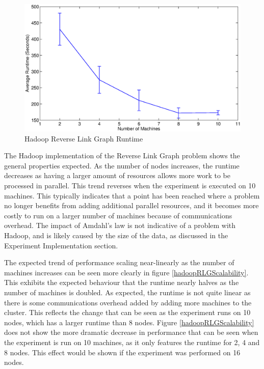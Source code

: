 \begin{figure}[H]
	\centering
	\includegraphics[scale=0.6]{resources/HadoopRLG.eps}
	\caption{Hadoop Reverse Link Graph Runtime}
	\label{hadoopRLGRuntime}
\end{figure}

The Hadoop implementation of the Reverse Link Graph problem shows the general properties expected. As the number of nodes increases, the runtime decreases as having a larger amount of resources allows more work to be processed in parallel. This trend reverses when the experiment is executed on 10 machines. This typically indicates that a point has been reached where a problem no longer benefits from adding additional parallel resources, and it becomes more costly to run on a larger number of machines because of communications overhead. The impact of Amdahl's law \cite{amdahl1967validity} is not indicative of a problem with Hadoop, and is likely caused by the size of the data, as discussed in the Experiment Implementation section.

The expected trend of performance scaling near-linearly as the number of machines increases can be seen more clearly in figure \ref{hadoopRLGScalability}. This exhibits the expected behaviour that the runtime nearly halves as the number of machines is doubled. As expected, the runtime is not quite linear as there is some communications overhead added by adding more machines to the cluster. This reflects the change that can be seen as the experiment runs on 10 nodes, which has a larger runtime than 8 nodes. Figure \ref{hadoopRLGScalability} does not show the more dramatic decrease in performance that can be seen when the experiment is run on 10 machines, as it only features the runtime for 2, 4 and 8 nodes. This effect would be shown if the experiment was performed on 16 nodes.

